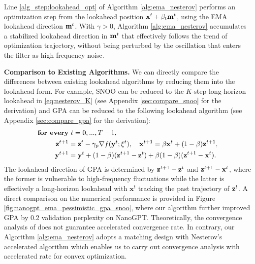 \documentclass{article}
\theoremstyle{plain}
\theoremstyle{definition}
\theoremstyle{remark}
\def\bx{\mathbf{x}}
\begin{document}
Line \ref{alg_step:lookahead_opt} of Algorithm \ref{alg:ema_nesterov} performs an optimization step from the lookahead position $\bx^t + \beta_t {\bf m}^t$, using the EMA lookahead direction ${\bf m}^t$. With $\gamma > 0$, Algorithm \ref{alg:ema_nesterov} accumulates a stabilized lookahead direction in ${\bf m}^t$ that effectively follows the trend of optimization trajectory, without being perturbed by the oscillation that enters the filter as high frequency noise.

\textbf{Comparison to Existing Algorithms.} 
We can directly compare the differences between existing lookahead algorithms by reducing them into the lookahead form. For example, SNOO \citep{kallusky2025snoo} can be reduced to the $K$-step long-horizon lookahead in \eqref{eq:nesterov_K} (see Appendix \ref{sec:compare_snoo} for the derivation) and GPA \citep{defazio2025smoothing} can be reduced to the following lookahead algorithm (see Appendix \ref{sec:compare_gpa} for the derivation):
\begin{equation} 
    \begin{aligned}
    \textbf{for every}&~ t=0, ..., T-1,\\
        {\bf z}^{t+1} &= {\bf z}^t - \gamma_p \nabla f({\bf y}^t; \xi^t), \quad {\bf x}^{t+1} = \beta {\bf x}^t + ( 1 - \beta) {\bf z}^{t+1}, \\
        {\bf y}^{t+1} &= {\bf y}^{t} + (1- \beta)({\bf z}^{t+1} - {\bf z}^t) + \beta(1-\beta)({\bf z}^{t+1} - {\bf x}^t).
    \end{aligned}
\end{equation}
The lookahead direction of GPA is determined by ${\bf z}^{t+1} - {\bf z}^t$ and ${\bf z}^{t+1} - \bx^t$, where the former is vulnerable to high-frequency fluctuations while the latter is effectively a long-horizon lookahead with $\bx^t$ tracking the past trajectory of ${\bf z}^t$. A direct comparison on the numerical performance is provided in Figure \ref{fig:nanogpt_ema_pessimistic_gpa_snoo}, where our algorithm further improved GPA by 0.2 validation perplexity on NanoGPT. 
Theoretically, the convergence analysis of \cite{defazio2025smoothing} does not guarantee accelerated convergence rate. In contrary, our Algorithm \ref{alg:ema_nesterov} adopts a matching design with Nesterov's accelerated algorithm which enables us to carry out convergence analysis with accelerated rate for convex optimization.


\vspace{-0.5\baselineskip}
\end{document}
